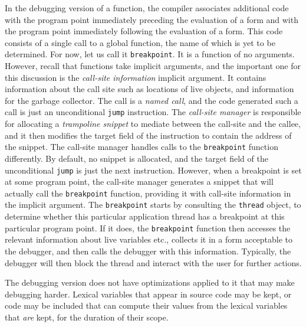 In the debugging version of a function, the compiler associates
additional code with the program point immediately preceding the
evaluation of a form and with the program point immediately following
the evaluation of a form.  This code consists of a single call to a
global function, the name of which is yet to be determined.  For now,
let us call it \texttt{breakpoint}.  It is a function of no arguments.
However, recall that functions take implicit arguments, and the
important one for this discussion is the \emph{call-site information}
implicit argument.  It contains information about the call site such
as locations of live objects, and information for the garbage
collector.  The call is a \emph{named call}, and the code generated
such a call is just an unconditional \texttt{jump} instruction.  The
\emph{call-site manager} is responsible for allocating a
\emph{trampoline snippet} to mediate between the call-site and the
callee, and it then modifies the target field of the instruction to
contain the address of the snippet.  The call-site manager handles
calls to the \texttt{breakpoint} function differently.  By default, no
snippet is allocated, and the target field of the unconditional
\texttt{jump} is just the next instruction.  However, when a
breakpoint is set at some program point, the call-site manager
generates a snippet that will actually call the \texttt{breakpoint}
function, providing it with call-site information in the implicit
argument.  The \texttt{breakpoint} starts by consulting the
\texttt{thread} object, to determine whether this particular
application thread has a breakpoint at this particular program point.
If it does, the \texttt{breakpoint} function then accesses the
relevant information about live variables etc., collects it in a form
acceptable to the debugger, and then calls the debugger with this
information.  Typically, the debugger will then block the thread and
interact with the user for further actions.

The debugging version does not have optimizations applied to it that
may make debugging harder.  Lexical variables that appear in source
code may be kept, or code may be included that can compute their
values from the lexical variables that \emph{are} kept, for the
duration of their scope.


